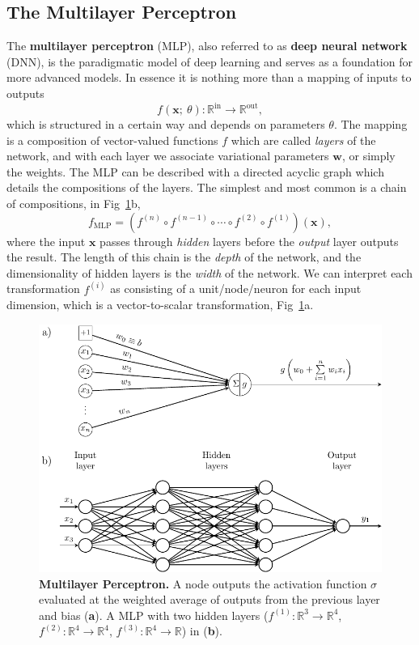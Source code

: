 \subsection{The Multilayer Perceptron}
The \textbf{multilayer perceptron} (MLP), also referred to as \textbf{deep neural network} (DNN), is the paradigmatic model of deep learning and serves as a foundation for more advanced models. In essence it is nothing more than a mapping of inputs to outputs
\begin{equation}
	f(\mathbf{x}; ~\theta): \mathbb{R}^\text{in} \rightarrow \mathbb{R}^{\text{out}},
\end{equation}
which is structured in a certain way and depends on parameters $\theta$. The mapping is a composition of vector-valued functions $f$ which are called \emph{layers} of the network, and with each layer we associate variational parameters $\mathbf{w}$, or simply the weights. The MLP can be described with a directed acyclic graph which details the compositions of the layers. The simplest and most common is a chain of compositions, in Fig~\ref{fig:mlp}b, 
\begin{equation}
f_{\text{MLP}} = \left(f^{(n)} \circ f^{(n-1)} \circ \cdots \circ f^{(2)} \circ f^{(1)} \right)(\mathbf{x}),
\end{equation}
where the input $\textbf{x}$ passes through \emph{hidden} layers before the \emph{output} layer outputs the result. The length of this chain is the \emph{depth} of the network, and the dimensionality of hidden layers is the \emph{width} of the network. We can interpret each transformation $f^{(i)}$ as consisting of a unit/node/neuron for each input dimension, which is a vector-to-scalar transformation, Fig~\ref{fig:mlp}a.
\begin{figure}[H]
	\centering
	\includegraphics[width=\linewidth]{Chapter4/Figs/Vector/mlp.pdf}
	\caption[Multilayer Perceptron]{\textbf{Multilayer Perceptron.} A node outputs the activation function $\sigma$ evaluated at the weighted average of outputs from the previous layer and bias (\textbf{a}). A MLP with two hidden layers ($f^{(1)}: \mathbb{R}^3 \rightarrow \mathbb{R}^4$, $f^{(2)}: \mathbb{R}^4 \rightarrow \mathbb{R}^4$, $f^{(3)}: \mathbb{R}^4 \rightarrow \mathbb{R}$) in (\textbf{b}).}
	\label{fig:mlp}
\end{figure} 
